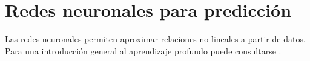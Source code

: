\section{Redes neuronales para predicción}

Las redes neuronales permiten aproximar relaciones no lineales a partir de datos. Para una introducción general al aprendizaje profundo puede consultarse \textcite{goodfellow2016deep}.

